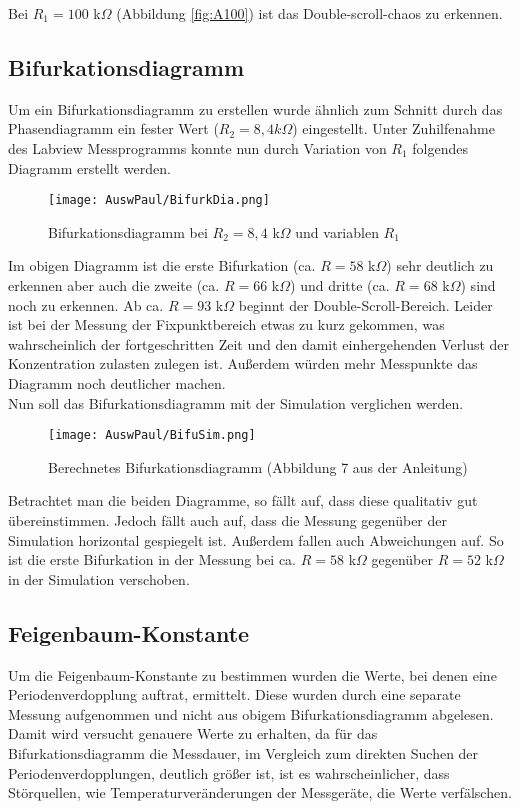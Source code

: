Bei $R_1 = 100$ k$\Omega$ (Abbildung \ref{fig:A100}) ist das Double-scroll-chaos zu erkennen.
\newpage
\subsection{Bifurkationsdiagramm}
Um ein Bifurkationsdiagramm zu erstellen wurde ähnlich zum Schnitt durch das Phasendiagramm ein fester Wert (\(R_2=8,4k \Omega\)) eingestellt. Unter Zuhilfenahme des Labview Messprogramms konnte nun durch Variation von \(R_1\) folgendes Diagramm erstellt werden.

\begin{figure}[h]
    \centering
    \texttt{[image: AuswPaul/BifurkDia.png]}
    \caption{Bifurkationsdiagramm bei $R_2 = 8,4$ k$\Omega$ und variablen $R_1$}
\end{figure}

Im obigen Diagramm ist die erste Bifurkation (ca. $R = 58$ k$\Omega$) sehr deutlich zu erkennen aber auch die zweite (ca. $R = 66$ k$\Omega$) und dritte (ca. $R = 68$ k$\Omega$) sind noch zu erkennen. Ab ca. $R=93$ k$\Omega$ beginnt der Double-Scroll-Bereich. Leider ist bei der Messung der Fixpunktbereich etwas zu kurz gekommen, was wahrscheinlich der fortgeschritten Zeit und den damit einhergehenden Verlust der Konzentration zulasten zulegen ist. Außerdem würden mehr Messpunkte das Diagramm noch deutlicher machen.\\
Nun soll das Bifurkationsdiagramm mit der Simulation verglichen werden.

\newpage
\begin{figure}[h]
    \centering
    \texttt{[image: AuswPaul/BifuSim.png]}
    \caption{Berechnetes Bifurkationsdiagramm (Abbildung 7 aus der Anleitung)}
\end{figure}

Betrachtet man die beiden Diagramme, so fällt auf, dass diese qualitativ gut übereinstimmen. Jedoch fällt auch auf, dass die Messung gegenüber der Simulation horizontal gespiegelt ist. Außerdem fallen auch Abweichungen auf. So ist die erste Bifurkation in der Messung bei ca. $R=58$ k$\Omega$ gegenüber $R=52$ k$\Omega$ in der Simulation verschoben.


\newpage
\subsection{Feigenbaum-Konstante}

Um die Feigenbaum-Konstante zu bestimmen wurden die Werte, bei denen eine Periodenverdopplung auftrat, ermittelt. 
Diese wurden durch eine separate Messung aufgenommen und nicht aus obigem Bifurkationsdiagramm abgelesen.
Damit wird versucht genauere Werte zu erhalten, da für das Bifurkationsdiagramm die Messdauer, im Vergleich zum direkten Suchen der Periodenverdopplungen, deutlich größer ist, ist es wahrscheinlicher, dass Störquellen, wie Temperaturveränderungen der Messgeräte, die Werte verfälschen.\\

